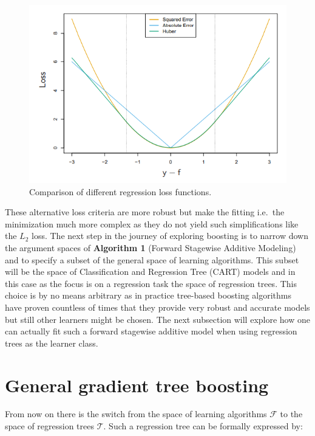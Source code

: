 \documentclass[
]{book}
\begin{document}
\begin{figure}

{\centering \includegraphics[width=0.7\linewidth]{_pictures/huber_loss} 

}

\caption{Comparison of different regression loss functions.}\label{fig:lossComp}
\end{figure}

These alternative loss criteria are more robust but make the fitting i.e.~the minimization much more complex as they do not yield such simplifications like the \(L_2\) loss.\citep{elements} The next step in the journey of exploring boosting is to narrow down the argument spaces of \textbf{Algorithm 1} (Forward Stagewise Additive Modeling) and to specify a subset of the general space of learning algorithms. This subset will be the space of Classification and Regression Tree (CART) models and in this case as the focus is on a regression task the space of regression trees. This choice is by no means arbitrary as in practice tree-based boosting algorithms have proven countless of times that they provide very robust and accurate models but still other learners might be chosen.\citep[\citet{HandsOnMLwithR}]{elements} The next subsection will explore how one can actually fit such a forward stagewise additive model when using regression trees as the learner class.

\hypertarget{general-gradient-tree-boosting}{%
\section{General gradient tree boosting}\label{general-gradient-tree-boosting}}

From now on there is the switch from the space of learning algorithms \(\mathcal{F}\) to the space of regression trees \(\mathcal{T}\). Such a regression tree can be formally expressed by:
\end{document}
